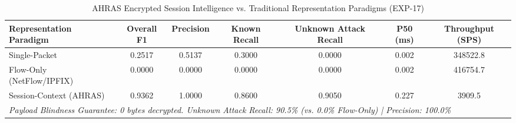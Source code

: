 \begin{table}[t]
\centering
\small
\caption{AHRAS Encrypted Session Intelligence vs. Traditional Representation Paradigms (EXP-17)}
\label{tab:encrypted_session_eval}
\begin{tabular}{lcccccc}
\toprule
\textbf{Representation Paradigm} & \textbf{Overall F1} & \textbf{Precision} & \textbf{Known Recall} & \textbf{Unknown Attack Recall} & \textbf{P50 (ms)} & \textbf{Throughput (SPS)} \\
\midrule
Single-Packet & 0.2517 & 0.5137 & 0.3000 & 0.0000 & 0.002 & 348522.8 \\
Flow-Only (NetFlow/IPFIX) & 0.0000 & 0.0000 & 0.0000 & 0.0000 & 0.002 & 416754.7 \\
Session-Context (AHRAS) & 0.9362 & 1.0000 & 0.8600 & 0.9050 & 0.227 & 3909.5 \\
\midrule
\multicolumn{7}{l}{\textit{Payload Blindness Guarantee: 0 bytes decrypted. Unknown Attack Recall: 90.5\% (vs. 0.0\% Flow-Only) | Precision: 100.0\%}} \\
\bottomrule
\end{tabular}
\end{table}

